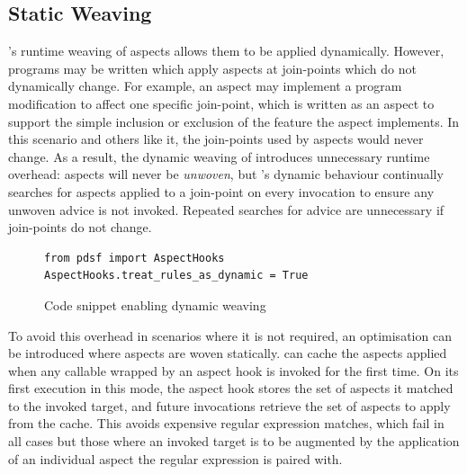 \subsection{Static Weaving}
\label{static_weaving}

\pdsfthree{}'s runtime weaving of aspects allows them to be applied dynamically.
However, programs may be written which apply aspects at join-points which do not
dynamically change. For example, an aspect may implement a program modification
to affect one specific join-point, which is written as an aspect to support the
simple inclusion or exclusion of the feature the aspect implements. In this
scenario and others like it, the join-points used by aspects would never change.
As a result, the dynamic weaving of \pdsfthree introduces unnecessary runtime
overhead: aspects will never be \emph{unwoven}, but \pdsfthree{}'s dynamic
behaviour continually searches for aspects applied to a join-point on every
invocation to ensure any unwoven advice is not invoked. Repeated searches for
advice are unnecessary if join-points do not change.

\begin{figure}[h]
    \begin{lstlisting}[style=footnotesize_python]
from pdsf import AspectHooks
AspectHooks.treat_rules_as_dynamic = True
    \end{lstlisting}
    \caption{Code snippet enabling dynamic weaving}
    \label{fig:enabling_dynamic_weaving}
\end{figure}

To avoid this overhead in scenarios where it is not required, an optimisation
can be introduced where aspects are woven statically. \pdsfthree can cache the
aspects applied when any callable wrapped by an aspect hook is invoked for the
first time. On its first execution in this mode, the aspect hook stores the set
of aspects it matched to the invoked target, and future invocations retrieve the
set of aspects to apply from the cache. This avoids expensive regular expression
matches,
which fail in all cases but those where an invoked target is to be augmented by
the application of an individual aspect the regular expression is paired
with.

